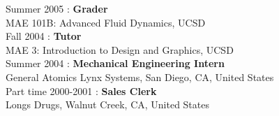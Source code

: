 \documentclass[12pt]{article}
\begin{document}

\noindent Summer 2005 : \textbf{Grader}\\
 MAE 101B: Advanced Fluid Dynamics, UCSD\\

\noindent Fall 2004 : \textbf{Tutor}\\
 MAE 3: Introduction to Design and Graphics, UCSD\\

\noindent Summer 2004 : \textbf{Mechanical Engineering Intern}\\
General Atomics Lynx Systems, San Diego, CA, United States\\


\noindent Part time 2000-2001 : \textbf{Sales Clerk}\\
Longs Drugs, Walnut Creek, CA, United States\\

\thispagestyle{lastpagestyle}
\end{document}
